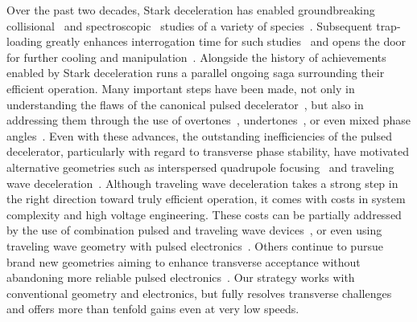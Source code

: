 \documentclass[%
 reprint,
 amsmath,amssymb,
 aps,
prl,
]{revtex4-1}
\begin{document}
Over the past two decades, Stark deceleration has enabled groundbreaking collisional~\cite{Sawyer2011,Kirste2012,Gao2018} and spectroscopic~\cite{Veldhoven2004,Hudson2006,Lev2006,Fast2018} studies of a variety of species~\cite{VanDeMeerakker2012}. 
Subsequent trap-loading greatly enhances interrogation time for such studies~\cite{Sawyer2008} and opens the door for further cooling and manipulation~\cite{Stuhl2012evap, Reens2017}. 
Alongside the history of achievements enabled by Stark deceleration runs a parallel ongoing saga surrounding their efficient operation. 
Many important steps have been made, not only in understanding the flaws of the canonical pulsed decelerator~\cite{VanDeMeerakker2006,Sawyer2008a}, but also in addressing them through the use of overtones~\cite{VanDeMeerakker2005a,Scharfenberg2009}, undertones~\cite{Zhang2016}, or even mixed phase angles~\cite{Parazzoli2009,Hou2013}. 
Even with these advances, the outstanding inefficiencies of the pulsed decelerator, particularly with regard to transverse phase stability, have motivated alternative geometries such as interspersed quadrupole focusing~\cite{Sawyer2008a} and traveling wave deceleration~\cite{Osterwalder2010,VandenBerg2014,Fabrikant2014}. 
Although traveling wave deceleration takes a strong step in the right direction toward truly efficient operation, it comes with costs in system complexity and high voltage engineering. 
These costs can be partially addressed by the use of combination pulsed and traveling wave devices~\cite{Quintero-Perez2013}, or even using traveling wave geometry with pulsed electronics~\cite{Hou2016,Shyur2017}. 
Others continue to pursue brand new geometries aiming to enhance transverse acceptance without abandoning more reliable pulsed electronics~\cite{Wang2016}. 
Our strategy works with conventional geometry and electronics, but fully resolves transverse challenges and offers more than tenfold gains even at very low speeds.
\end{document}
